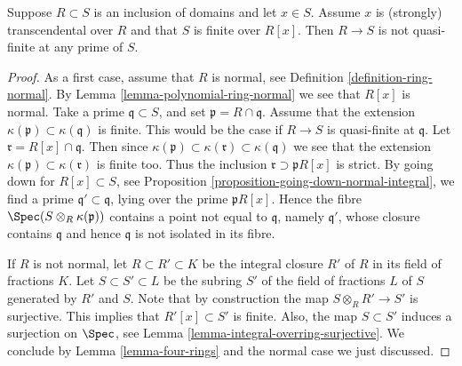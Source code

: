 \begin{lemma}
\label{lemma-domains-transcendental-not-quasi-finite}
Suppose $R\subset S$ is an inclusion of domains and
let $x \in S$. Assume $x$ is (strongly) transcendental over $R$
and that $S$ is finite over $R[x]$. Then $R \to S$ is not
quasi-finite at any prime of $S$.
\end{lemma}

\begin{proof}
As a first case, assume that $R$ is normal, see
Definition \ref{definition-ring-normal}.
By Lemma \ref{lemma-polynomial-ring-normal}
we see that $R[x]$ is normal.
Take a prime $\mathfrak q \subset S$,
and set $\mathfrak p = R \cap \mathfrak q$.
Assume that the extension $\kappa(\mathfrak p)
\subset \kappa(\mathfrak q)$ is finite.
This would be the case if $R \to S$ is
quasi-finite at $\mathfrak q$.
Let $\mathfrak r = R[x] \cap \mathfrak q$.
Then since $\kappa(\mathfrak p)
\subset \kappa(\mathfrak r) \subset \kappa(\mathfrak q)$
we see that the extension $\kappa(\mathfrak p)
\subset \kappa(\mathfrak r)$ is finite too.
Thus the inclusion $\mathfrak r \supset \mathfrak p R[x]$
is strict. By going down for $R[x] \subset S$,
see Proposition \ref{proposition-going-down-normal-integral},
we find a prime $\mathfrak q' \subset \mathfrak q$,
lying over the prime $\mathfrak pR[x]$. Hence
the fibre $\Spec(S \otimes_R \kappa(\mathfrak p))$
contains a point not equal to $\mathfrak q$,
namely $\mathfrak q'$, whose closure contains $\mathfrak q$ and hence
$\mathfrak q$ is not isolated in its fibre.

\medskip\noindent
If $R$ is not normal, let $R \subset R' \subset K$ be
the integral closure $R'$ of $R$ in its field of fractions
$K$. Let $S \subset S' \subset L$ be the subring $S'$ of
the field of fractions $L$ of $S$ generated by $R'$ and
$S$. Note that by construction the map $S \otimes_R R'
\to S'$ is surjective. This implies that $R'[x] \subset S'$
is finite. Also, the map $S \subset S'$
induces a surjection on $\Spec$, see
Lemma \ref{lemma-integral-overring-surjective}.
We conclude by Lemma \ref{lemma-four-rings} and the normal case
we just discussed.
\end{proof}
